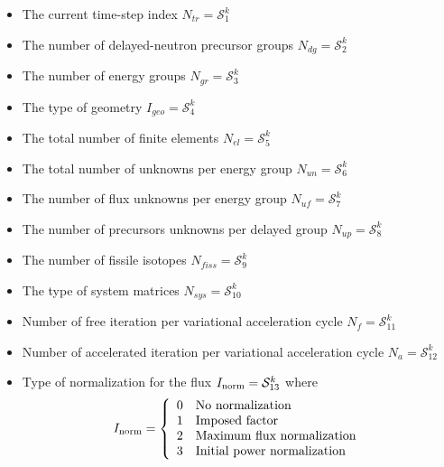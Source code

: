 \begin{itemize}

\item The current time-step index $N_{tr}=\mathcal{S}^{k}_{1}$

\item The number of delayed-neutron precursor groups $N_{dg}=\mathcal{S}^{k}_{2}$

\item The number of energy groups $N_{gr}=\mathcal{S}^{k}_{3}$

\item The type of geometry $I_{geo} = \mathcal{S}^{k}_{4}$

\item The total number of finite elements $N_{el}=\mathcal{S}^{k}_{5}$

\item The total number of unknowns per energy group $N_{un}=\mathcal{S}^{k}_{6}$

\item The number of flux unknowns per energy group $N_{uf}=\mathcal{S}^{k}_{7}$

\item The number of precursors unknowns per delayed group $N_{up}=\mathcal{S}^{k}_{8}$

\item The number of fissile isotopes $N_{fiss}=\mathcal{S}^{k}_{9}$

\item The type of system matrices $N_{sys}=\mathcal{S}^{k}_{10}$

\item Number of free iteration per variational acceleration cycle $N_{f}=\mathcal{S}^{k}_{11}$
 
\item Number of accelerated iteration per variational acceleration cycle $N_{a}=\mathcal{S}^{k}_{12}$ 

\item Type of normalization for the flux $I_{\rm norm}=\mathcal{S}^{k}_{13}$ where
\begin{displaymath}
I_{\rm norm} = \left\{
\begin{array}{rl}
 0 & \textrm{No normalization} \\
 1 & \textrm{Imposed factor} \\
 2 & \textrm{Maximum flux normalization} \\
 3 & \textrm{Initial power normalization}
\end{array} \right.
\end{displaymath}


\end{itemize}
